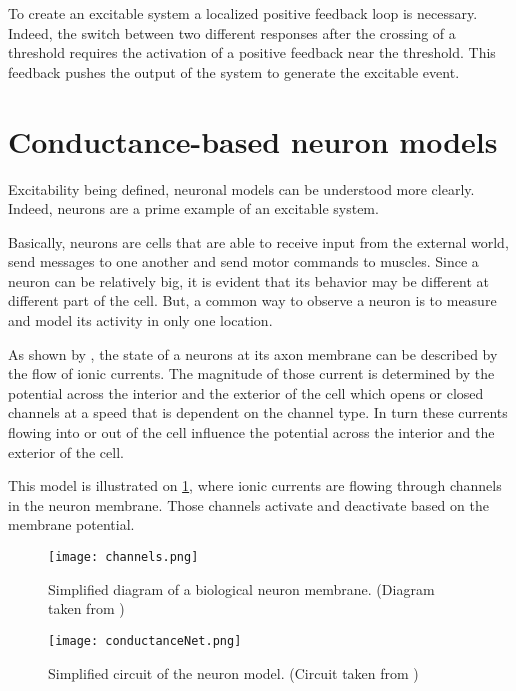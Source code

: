 To create an excitable system a localized positive feedback loop is necessary. 
Indeed, the switch between two different responses after the crossing of a threshold requires the activation of a positive feedback near the threshold. 
This feedback pushes the output of the system to generate the excitable event.

\section{Conductance-based neuron models}

Excitability being defined, neuronal models can be understood more clearly. Indeed, neurons are a prime example of an excitable system.

Basically, neurons are cells that are able to receive input from the external world, send messages to one another and send motor commands to muscles. 
Since a neuron can be relatively big, it is evident that its behavior may be different at different part of the cell. 
But, a common way to observe a neuron is to measure and model its activity in only one location.

As shown by \citet{neuronIons}, the state of a neurons at its axon membrane can be described by the flow of ionic currents. 
The magnitude of those current is determined by the potential across the interior and the exterior of the cell which opens or closed channels at a speed that is dependent on the channel type.
In turn these currents flowing into or out of the cell influence the potential across the interior and the exterior of the cell. 

This model is illustrated on \cref{fig:conductance_neuron}, where ionic currents are flowing through channels in the neuron membrane. Those channels activate and deactivate based on the membrane potential.

\begin{figure}[htb]
    \centering
    \texttt{[image: channels.png]}
    \caption{Simplified diagram of a biological neuron membrane. (Diagram taken from \citet{channelDiagram})}
    \label{fig:conductance_neuron}
\end{figure}

\begin{figure}[htb]
    \centering
    \texttt{[image: conductanceNet.png]}
    \caption{Simplified circuit of the neuron model. (Circuit taken from \citet{electricDiagram})}
    \label{fig:conductance_neuron_circuit}
\end{figure}

